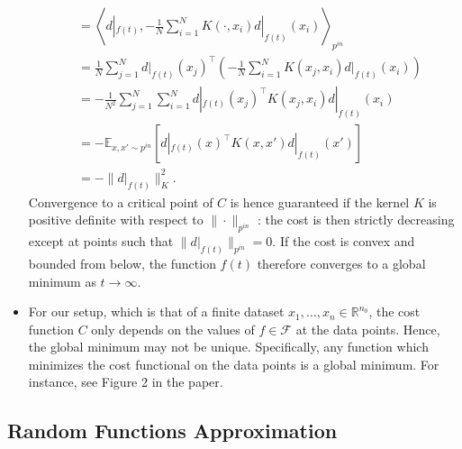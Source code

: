 \documentclass[10pt]{article}
\newcommand{\RR}{\mathbb{R}}
\newcommand{\EE}{\mathbb{E}}
\newcommand{\FF}{\mathcal{F}}
\newcommand{\inner}[2]{\left\langle #1, #2 \right\rangle}
\newcommand{\pin}{{p^{in}}}
\begin{document}
\begin{itemize}
\begin{align*}
&= \inner{d|_{f(t)}}{-\frac{1}{N} \sum_{i = 1}^N K(\cdot,x_i) d|_{f(t)}(x_i)}_\pin \\
&= \frac{1}{N} \sum_{j = 1}^N d|_{f(t)}(x_j)^\top \left( -\frac{1}{N} \sum_{i = 1}^N K(x_j,x_i) d|_{f(t)}(x_i) \right) \\
&= -\frac{1}{N^2} \sum_{j = 1}^N \sum_{i = 1}^N d|_{f(t)}(x_j)^\top K(x_j,x_i) d|_{f(t)}(x_i) \\
&= - \EE_{x,x' \sim \pin} [d|_{f(t)}(x)^\top K(x,x') d|_{f(t)}(x')] \\
&= - \| d|_{f(t)} \|_K^2.
\end{align*}
Convergence to a critical point of $C$ is hence guaranteed if the kernel $K$ is positive definite with respect to $\|\cdot\|_{\pin}$ : the cost is then strictly decreasing except at points such that $\|d|_{f(t)}\|_{\pin} = 0$. If the cost is convex and bounded from below, the function $f(t)$ therefore converges to a global minimum as $t \rightarrow \infty$.
\item For our setup, which is that of a finite dataset $x_1, \ldots, x_n \in \RR^{n_0}$, the cost function $C$ only depends on the values of $f \in \FF$ at the data points. Hence, the global minimum may not be unique. Specifically, any function which minimizes the cost functional on the data points is a global minimum. For instance, see Figure 2 in the paper.
\end{itemize}

\newpage

\subsection{Random Functions Approximation}
\end{document}
